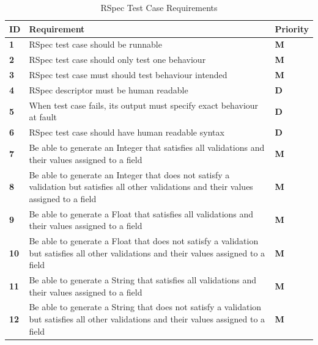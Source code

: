 \documentclass[a4paper,12pt]{article}
\begin{document}
\begin{table}
\centering
\caption{RSpec Test Case Requirements}
\label{my-label}
\begin{tabular}{|l|l|l|}
\hline
\textbf{ID} & \textbf{Requirement}                                                                                                                       & \textbf{Priority} \\ \hline
\textbf{1}  & RSpec test case should be runnable                                                                                                         & \textbf{M}        \\ \hline
\textbf{2}  & RSpec test case should only test one behaviour                                                                                             & \textbf{M}        \\ \hline
\textbf{3}  & RSpec test case must should test behaviour intended                                                                                        & \textbf{M}        \\ \hline
\textbf{4}  & RSpec descriptor must be human readable                                                                                                    & \textbf{D}        \\ \hline
\textbf{5}  & When test case fails, its output must specify exact behaviour at fault                                                                     & \textbf{D}        \\ \hline
\textbf{6}  & RSpec test case should have human readable syntax                                                                                          & \textbf{D}        \\ \hline
\textbf{7}  & Be able to generate an Integer that satisfies all validations and their values assigned to a field                                         & \textbf{M}        \\ \hline
\textbf{8}  & Be able to generate an Integer that does not satisfy a validation but satisfies all other validations and their values assigned to a field & \textbf{M}        \\ \hline
\textbf{9}  & Be able to generate a Float that satisfies all validations and their values assigned to a field                                            & \textbf{M}        \\ \hline
\textbf{10} & Be able to generate a Float that does not satisfy a validation but satisfies all other validations and their values assigned to a field    & \textbf{M}        \\ \hline
\textbf{11} & Be able to generate a String that satisfies all validations and their values assigned to a field                                           & \textbf{M}        \\ \hline
\textbf{12} & Be able to generate a String that does not satisfy a validation but satisfies all other validations and their values assigned to a field   & \textbf{M}        \\ \hline
\end{tabular}
\end{table}
\end{document}
